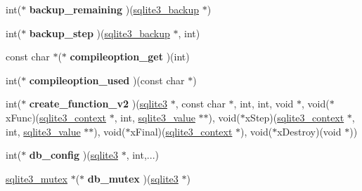 \begin{DoxyCompactItemize}
\item 
int($\ast$ {\bfseries backup\+\_\+remaining} )(\hyperlink{structsqlite3__backup}{sqlite3\+\_\+backup} $\ast$)\hypertarget{structsqlite3__api__routines_ae376d7dfa771f1c72272b32e2203c6f1}{}\label{structsqlite3__api__routines_ae376d7dfa771f1c72272b32e2203c6f1}

\item 
int($\ast$ {\bfseries backup\+\_\+step} )(\hyperlink{structsqlite3__backup}{sqlite3\+\_\+backup} $\ast$, int)\hypertarget{structsqlite3__api__routines_a3a8f0bc14589950ee606d5354ff364ed}{}\label{structsqlite3__api__routines_a3a8f0bc14589950ee606d5354ff364ed}

\item 
const char $\ast$($\ast$ {\bfseries compileoption\+\_\+get} )(int)\hypertarget{structsqlite3__api__routines_a86cf193c1eaf4f6766a3854cb25e2a83}{}\label{structsqlite3__api__routines_a86cf193c1eaf4f6766a3854cb25e2a83}

\item 
int($\ast$ {\bfseries compileoption\+\_\+used} )(const char $\ast$)\hypertarget{structsqlite3__api__routines_a788dd672feeff349c417beff9a7eb26c}{}\label{structsqlite3__api__routines_a788dd672feeff349c417beff9a7eb26c}

\item 
int($\ast$ {\bfseries create\+\_\+function\+\_\+v2} )(\hyperlink{structsqlite3}{sqlite3} $\ast$, const char $\ast$, int, int, void $\ast$, void($\ast$x\+Func)(\hyperlink{structsqlite3__context}{sqlite3\+\_\+context} $\ast$, int, \hyperlink{structMem}{sqlite3\+\_\+value} $\ast$$\ast$), void($\ast$x\+Step)(\hyperlink{structsqlite3__context}{sqlite3\+\_\+context} $\ast$, int, \hyperlink{structMem}{sqlite3\+\_\+value} $\ast$$\ast$), void($\ast$x\+Final)(\hyperlink{structsqlite3__context}{sqlite3\+\_\+context} $\ast$), void($\ast$x\+Destroy)(void $\ast$))\hypertarget{structsqlite3__api__routines_ae2cd022f6c2bb188773ef656d79d26f1}{}\label{structsqlite3__api__routines_ae2cd022f6c2bb188773ef656d79d26f1}

\item 
int($\ast$ {\bfseries db\+\_\+config} )(\hyperlink{structsqlite3}{sqlite3} $\ast$, int,...)\hypertarget{structsqlite3__api__routines_a60ceed179513c5ac09b0ed39c725dbf6}{}\label{structsqlite3__api__routines_a60ceed179513c5ac09b0ed39c725dbf6}

\item 
\hyperlink{structsqlite3__mutex}{sqlite3\+\_\+mutex} $\ast$($\ast$ {\bfseries db\+\_\+mutex} )(\hyperlink{structsqlite3}{sqlite3} $\ast$)\hypertarget{structsqlite3__api__routines_a9396b9f7fddc605df220ffd34dea261c}{}\label{structsqlite3__api__routines_a9396b9f7fddc605df220ffd34dea261c}


\end{DoxyCompactItemize}
